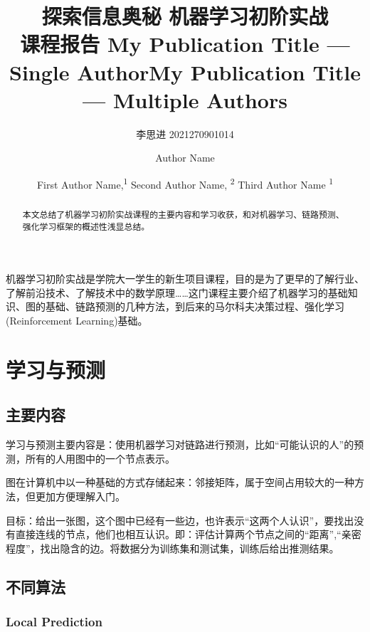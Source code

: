 \documentclass[letterpaper]{article} %
\title{ 探索信息奥秘 \quad 机器学习初阶实战 \\	课程报告 }
\author{
   李思进 2021270901014
    \\
}
\title{My Publication Title --- Single Author}
\author {
    Author Name \\
}
\title{My Publication Title --- Multiple Authors}
\author {
    First Author Name,\textsuperscript{\rm 1}
    Second Author Name, \textsuperscript{\rm 2}
    Third Author Name \textsuperscript{\rm 1} \\
}
\begin{document}
\maketitle

\begin{abstract}
本文总结了机器学习初阶实战课程的主要内容和学习收获，和对机器学习、链路预测、强化学习框架的概述性浅显总结。
\end{abstract}

机器学习初阶实战是学院大一学生的新生项目课程，目的是为了更早的了解行业、了解前沿技术、了解技术中的数学原理……这门课程主要介绍了机器学习的基础知识、图的基础、链路预测的几种方法，到后来的马尔科夫决策过程、强化学习(Reinforcement Learning)基础。

\section{学习与预测}

\subsection{主要内容}
学习与预测主要内容是：使用机器学习对链路进行预测，比如“可能认识的人”的预测，所有的人用图中的一个节点表示。

图在计算机中以一种基础的方式存储起来：邻接矩阵，属于空间占用较大的一种方法，但更加方便理解入门。

目标：给出一张图，这个图中已经有一些边，也许表示“这两个人认识”，要找出没有直接连线的节点，他们也相互认识。即：评估计算两个节点之间的“距离”,“亲密程度”，找出隐含的边。将数据分为训练集和测试集，训练后给出推测结果。

\subsection{不同算法}

\subsubsection{Local Prediction}
\end{document}
